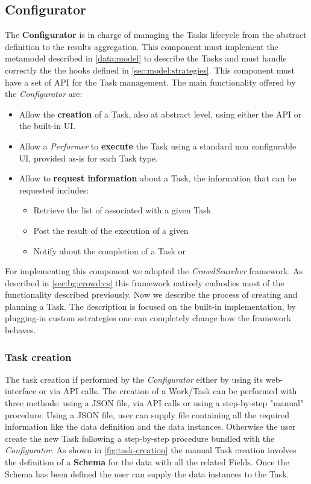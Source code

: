 \subsection{Configurator}\label{sec:configurator}
The \textbf{Configurator} is in charge of managing the Tasks lifecycle
from the abstract definition to the results aggregation. This component must
implement the metamodel described in \ref{data:model} to describe the Tasks and
must handle correctly the the hooks defined in \ref{sec:model:strategies}. This
component must have a set of API for the Task management.
The main functionality offered by the \emph{Configurator} are:
\begin{itemize}
    \item Allow the \textbf{creation} of a Task, also at abstract level, using
    either the API or the built-in UI.

    \item Allow a \emph{Performer} to \textbf{execute} the Task using a standard
    non configurable UI, provided as-is for each Task type.

    \item Allow to \textbf{request information} about a Task, the information
    that can be requested includes:
    \begin{itemize}
        \item Retrieve the list of \utask{} associated with a given Task

        \item Post the result of the execution of a given \utask{}

        \item Notify about the completion of a Task or \utask{}
    \end{itemize}
\end{itemize}

\noindent For implementing this component we adopted the \emph{CrowdSearcher} framework.
As described in \ref{sec:bg:crowd:cs} this framework natively embodies most of
the functionality described previously. Now we describe the process of creating
and planning a Task. The description is focused on the built-in implementation,
by plugging-in custom sstrategies one can completely change how the framework behaves.

\subsubsection{Task creation}
The task creation if performed by the \emph{Configurator} either by using its
web-interface or via API calls. The creation of a Work/Task can be performed with
three methods: using a JSON file, via API calls or using a step-by-step "manual" procedure.
Using a JSON file, user can supply file containing all the required information like
the data definition and the data instances.
Otherwise the user create the new Task following a step-by-step procedure bundled
with the \emph{Configurator}. As shown in \autoref{fig:task-creation} the manual Task
creation involves the definition of a \textbf{Schema} for the data with all the
related Fields. Once the Schema has been defined the user can supply the data
instances to the Task.

